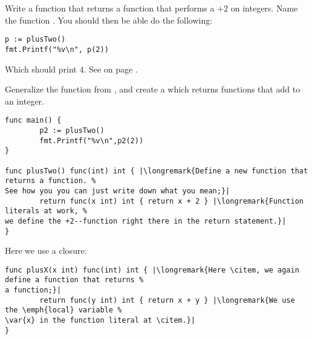 \begin{Exercise}[title={Functions that return functions},difficulty=1]
\label{ex:function}
\Question\label{ex:function q1} Write a function that returns a function
that performs a $+2$ on integers. Name the function .
You should then be able do the following:
\begin{lstlisting}
p := plusTwo()
fmt.Printf("%v\n", p(2))
\end{lstlisting}
Which should print 4.
See  on page \pageref{sec:callbacks}.

\Question\label{ex:function q2} Generalize the function from ,
and create a  which returns functions that add  to an
integer.
\end{Exercise}

\begin{Answer}
\Question
\begin{lstlisting}
func main() {
        p2 := plusTwo()
        fmt.Printf("%v\n",p2(2))
}

func plusTwo() func(int) int { |\longremark{Define a new function that returns a function. %
See how you you can just write down what you mean;}|
        return func(x int) int { return x + 2 } |\longremark{Function literals at work, %
we define the +2--function right there in the return statement.}|
}
\end{lstlisting}
\showremarks

\Question
Here we use a closure:
\begin{lstlisting}
func plusX(x int) func(int) int { |\longremark{Here \citem, we again define a function that returns %
a function;}|
        return func(y int) int { return x + y } |\longremark{We use the \emph{local} variable %
\var{x} in the function literal at \citem.}|
}
\end{lstlisting}
\showremarks
\end{Answer}
